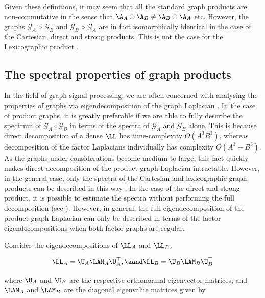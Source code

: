 Given these definitions, it may seem that all the standard graph products are non-commutative in the sense that $\A_A \oplus \A_B  \neq \A_B \oplus \A_A $ etc. However, the graphs $\mathcal{G}_A \, \diamond \, \mathcal{G}_B$ and $\mathcal{G}_B \, \diamond \, \mathcal{G}_A$ are in fact isomorphically identical in the case of the Cartesian, direct and strong products. This is not the case for the Lexicographic product \citep{Imrich2000}. 

\subsection{The spectral properties of graph products}

In the field of graph signal processing, we are often concerned with analysing the properties of graphs via eigendecomposition of the graph Laplacian \citep{Mieghem2010}. In the case of product graphs, it is greatly preferable if we are able to fully describe the spectrum of $\mathcal{G}_A \diamond \mathcal{G}_B$ in terms of the spectra of $\mathcal{G}_A$ and $\mathcal{G}_B$ alone. This is because direct decomposition of a dense $\LL$ has time-complexity $O(A^3B^3)$, whereas decomposition of the factor Laplacians individually has complexity $O(A^3 + B^3)$. As the graphs under considerations become medium to large, this fact quickly makes direct decomposition of the product graph Laplacian intractable. However, in the general case, only the spectra of the Cartesian and lexicographic graph products can be described in this way \citep{Barik2018}. In the case of the direct and strong product, it is possible to estimate the spectra without performing the full decomposition (see \citep{Sayama2016}). However, in general, the full eigendecomposition of the product graph Laplacian can only be described in terms of the factor eigendecompositions when both factor graphs are regular. 


Consider the eigendecompositions of $\LL_A$ and $\LL_B$. 

\begin{equation}
    \LL_A = \U_A \LAM_A \U_A^\top, \aand \LL_B = \U_B \LAM_B \U_B^\top
\end{equation}

where $\U_A$ and $\U_B$ are the respective orthonormal eigenvector matrices, and $\LAM_A$ and $\LAM_B$ are the diagonal eigenvalue matrices given by 


